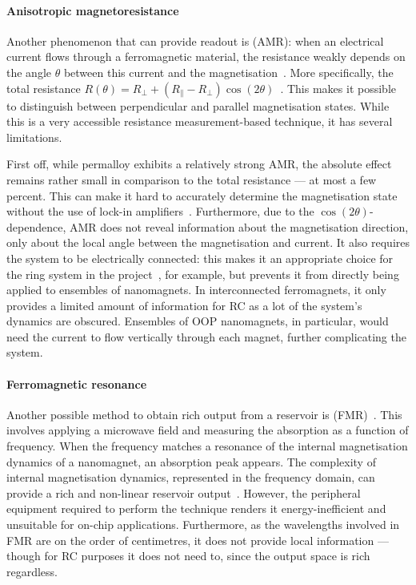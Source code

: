 \paragraph{Anisotropic magnetoresistance}
Another phenomenon that can provide readout is  (AMR): when an electrical current flows through a ferromagnetic material, the resistance weakly depends on the angle $\theta$ between this current and the magnetisation~\cite{AMR}.
More specifically, the total resistance $R(\theta) = R_\perp + (R_\parallel - R_\perp) \cos(2\theta)$~\cite{Hu2023}.
This makes it possible to distinguish between perpendicular and parallel magnetisation states.
While this is a very accessible resistance measurement-based technique, it has several limitations. \par
First off, while permalloy exhibits a relatively strong AMR, the absolute effect remains rather small in comparison to the total resistance --- at most a few percent.
This can make it hard to accurately determine the magnetisation state without the use of lock-in amplifiers~\cite{ArchitecturesNanoringRC,Vidamour2023}.
Furthermore, due to the $\cos(2 \theta)$-dependence, AMR does not reveal information about the magnetisation direction, only about the local angle between the magnetisation and current.
It also requires the system to be electrically connected: this makes it an appropriate choice for the ring system in the \spinengine project~\cite{Vidamour2023,ArchitecturesNanoringRC,DynamicEmergence_NanomagneticSystem}, for example, but prevents it from directly being applied to ensembles of nanomagnets.
In interconnected ferromagnets, it only provides a limited amount of information for RC as a lot of the system's dynamics are obscured.
Ensembles of OOP nanomagnets, in particular, would need the current to flow vertically through each magnet, further complicating the system.

\paragraph{Ferromagnetic resonance}
Another possible method to obtain rich output from a reservoir is  (FMR)~\cite{AdaptiveProgrammableRC,gartside2022reconfigurable}.
This involves applying a microwave field and measuring the absorption as a function of frequency.
When the frequency matches a resonance of the internal magnetisation dynamics of a nanomagnet, an absorption peak appears.
The complexity of internal magnetisation dynamics, represented in the frequency domain, can provide a rich and non-linear reservoir output~\cite{AdaptiveProgrammableRC,Gomez-Iriarte_FMR}.
However, the peripheral equipment required to perform the technique renders it energy-inefficient and unsuitable for on-chip applications.
Furthermore, as the wavelengths involved in FMR are on the order of centimetres, it does not provide local information --- though for RC purposes it does not need to, since the output space is rich regardless.

